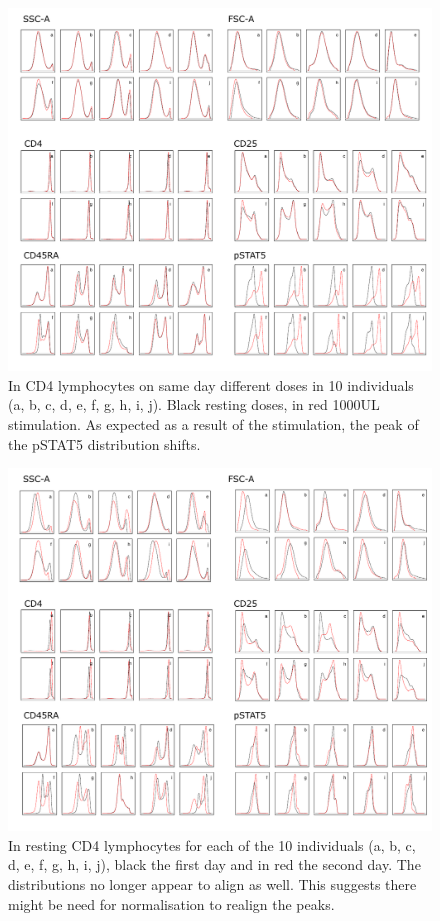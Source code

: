 \begin{figure}[h]
    \centering
    \includegraphics[scale=.75]{IL2/figures/channels-doses.pdf}
    \caption{  \label{figure:channels-doses} 
    In CD4 lymphocytes on same day different doses in 10 individuals (a, b, c, d, e, f, g, h, i, j).
  Black resting doses, in red 1000UL stimulation. As expected as a result of the stimulation, the peak of the pSTAT5 distribution shifts. }
\end{figure}


\begin{figure}[h]
    \centering
    \includegraphics[scale=.75]{IL2/figures/channels-days.pdf}
    \caption{  \label{figure:channels-days} 
    In resting CD4 lymphocytes for each of the 10 individuals (a, b, c, d, e, f, g, h, i, j), black the first day and in red the second day.
    The distributions no longer appear to align as well. This suggests there might be need for normalisation to realign the peaks.}
\end{figure}


